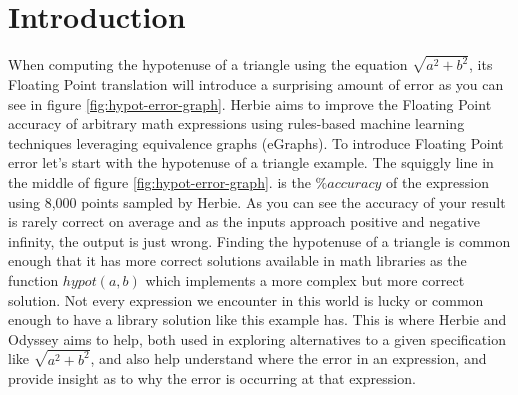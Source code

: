 \documentclass{article}
\begin{document}
\section{Introduction}
When computing the hypotenuse of a triangle using the equation $\sqrt{a^2 + b^2}$, its Floating Point translation will introduce a surprising amount of error as you can see in figure \ref{fig:hypot-error-graph}. Herbie aims to improve the Floating Point accuracy of arbitrary math expressions using rules-based machine learning techniques leveraging equivalence graphs (eGraphs). To introduce Floating Point error let's start with the hypotenuse of a triangle example. The squiggly line in the middle of figure \ref{fig:hypot-error-graph}.  is the $\%accuracy$ of the expression using 8,000 points sampled by Herbie. As you can see the accuracy of your result is rarely correct on average and as the inputs approach positive and negative infinity, the output is just wrong. Finding the hypotenuse of a triangle is common enough that it has more correct solutions available in math libraries as the function $hypot(a,b)$ which implements a more complex but more correct solution. Not every expression we encounter in this world is lucky or common enough to have a library solution like this example has. This is where Herbie and Odyssey \cite{Odyssey} aims to help, both used in exploring alternatives to a given specification like $\sqrt{a^2 + b^2}$, and also help understand where the error in an expression, and provide insight as to why the error is occurring at that expression.
\end{document}
